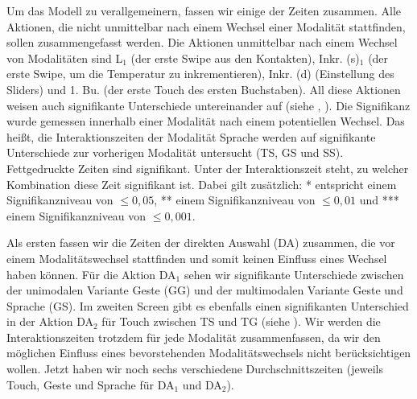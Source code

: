 Um das Modell zu verallgemeinern, fassen wir einige der Zeiten zusammen.
Alle Aktionen, die nicht unmittelbar nach einem Wechsel einer Modalität stattfinden, sollen zusammengefasst werden.
Die Aktionen unmittelbar nach einem Wechsel von Modalitäten sind L$_1$ (der erste Swipe aus den Kontakten), Inkr. (s)$_1$ (der erste Swipe, um die Temperatur zu inkrementieren), Inkr. (d) (Einstellung des Sliders) und 1. Bu. (der erste Touch des ersten Buchstaben).
All diese Aktionen weisen auch signifikante Unterschiede untereinander auf (siehe , ).
Die Signifikanz wurde gemessen innerhalb einer Modalität nach einem potentiellen Wechsel.
Das heißt, die Interaktionszeiten der Modalität Sprache werden auf signifikante Unterschiede zur vorherigen Modalität untersucht (TS, GS und SS).
Fettgedruckte Zeiten sind signifikant.
Unter der Interaktionszeit steht, zu welcher Kombination diese Zeit signifikant ist.
Dabei gilt zusätzlich: * entspricht einem Signifikanzniveau von $\leq 0,05$, ** einem Signifikanzniveau von $\leq 0,01$ und *** einem Signifikanzniveau von $\leq 0,001$.

Als ersten fassen wir die Zeiten der direkten Auswahl (DA) zusammen, die vor einem Modalitätswechsel stattfinden und somit keinen Einfluss eines Wechsel haben können.
Für die Aktion DA$_1$ sehen wir signifikante Unterschiede zwischen der unimodalen Variante Geste (GG) und der multimodalen Variante Geste und Sprache (GS).
Im zweiten Screen gibt es ebenfalls einen signifikanten Unterschied in der Aktion DA$_2$ für Touch zwischen TS und TG (siehe ).
Wir werden die Interaktionszeiten trotzdem für jede Modalität zusammenfassen, da wir den möglichen Einfluss eines bevorstehenden Modalitätswechsels nicht berücksichtigen wollen.
Jetzt haben wir noch sechs verschiedene Durchschnittszeiten (jeweils Touch, Geste und Sprache für DA$_1$ und DA$_2$).

